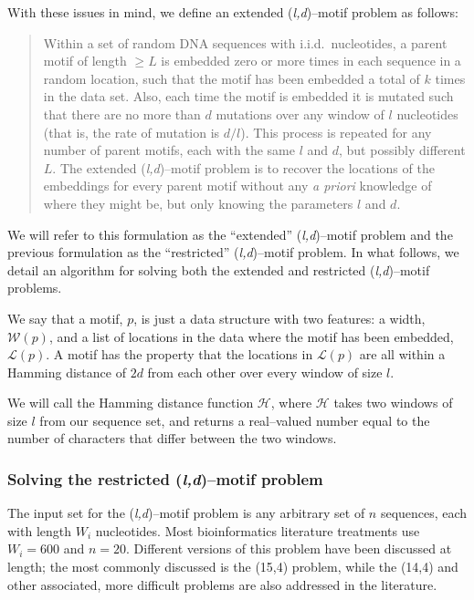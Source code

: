     With these issues in mind, we define an extended (\textit{l,d})--motif problem
    as follows:
    \begin{quotation}
    Within a set of random DNA sequences with i.i.d.\
    nucleotides, a parent motif of length $\geq L$
    is embedded zero or more times in each sequence in
    a random location, such that the motif has been
    embedded a total of $k$ times in the data set.
    Also, each time the motif is embedded it is mutated
    such that there are no more than $d$ mutations over
    any window of $l$ nucleotides (that is, the rate of mutation is $d/l$).
    This process is
    repeated for any number of parent motifs, each with
    the same $l$ and $d$, but possibly different $L$.
    The extended (\textit{l,d})--motif problem is to recover the
    locations of the embeddings for every parent motif
    without any \textit{a priori} knowledge of where
    they might be, but only knowing the parameters $l$ and $d$.
    \end{quotation}
    We will refer to this formulation as the ``extended'' (\textit{l,d})--motif
    problem and the previous formulation as the ``restricted''
    (\textit{l,d})--motif problem.  In what follows, we detail an algorithm
    for solving both the extended and restricted (\textit{l,d})--motif problems.

    We say that a motif, $p$, is just a data structure with two features:
    a width, $\mathscr{W}(p)$, and a list of locations in the data
    where the motif has been embedded, $\mathscr{L}(p)$.  A motif has
    the property that the locations in $\mathscr{L}(p)$ are all within a
    Hamming distance of $2d$ from each other over every window of size $l$.

        We will call the Hamming distance function
    $\mathscr{H}$, where $\mathscr{H}$
    takes two windows of size $l$ from our sequence set,
    and returns a real--valued number equal to the
    number of characters that differ between the two windows.


    \subsubsection{Solving the restricted (\textit{l,d})--motif problem}
        The input set for the (\textit{l,d})--motif problem is any arbitrary set of $n$
    sequences, each with length $W_i$ nucleotides.  Most bioinformatics
    literature treatments use $W_i=600$ and $n=20$.  Different versions of
    this problem have been discussed at length; the most commonly discussed
    is the (15,4) problem, while the (14,4) and other associated, more
    difficult problems are also addressed in the literature.

